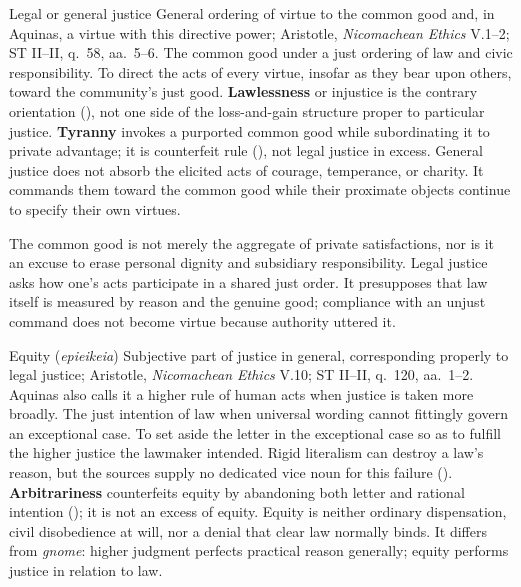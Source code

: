 
\virtuedossier
  {Legal or general justice}
  {General ordering of virtue to the common good and, in Aquinas, a virtue with this directive power; Aristotle, \emph{Nicomachean Ethics} V.1--2; ST II--II, q.~58, aa.~5--6.}
  {The common good under a just ordering of law and civic responsibility.}
  {To direct the acts of every virtue, insofar as they bear upon others, toward the community's just good.}
  {\textbf{Lawlessness} or injustice is the contrary orientation (), not one side of the loss-and-gain structure proper to particular justice.}
  {\textbf{Tyranny} invokes a purported common good while subordinating it to private advantage; it is counterfeit rule (), not legal justice in excess.}
  {General justice does not absorb the elicited acts of courage, temperance, or charity. It commands them toward the common good while their proximate objects continue to specify their own virtues.}

The common good is not merely the aggregate of private satisfactions, nor is it an excuse to erase personal dignity and subsidiary responsibility. Legal justice asks how one's acts participate in a shared just order. It presupposes that law itself is measured by reason and the genuine good; compliance with an unjust command does not become virtue because authority uttered it.


\virtuedossier
  {Equity (\emph{epieikeia})}
  {Subjective part of justice in general, corresponding properly to legal justice; Aristotle, \emph{Nicomachean Ethics} V.10; ST II--II, q.~120, aa.~1--2. Aquinas also calls it a higher rule of human acts when justice is taken more broadly.}
  {The just intention of law when universal wording cannot fittingly govern an exceptional case.}
  {To set aside the letter in the exceptional case so as to fulfill the higher justice the lawmaker intended.}
  {Rigid literalism can destroy a law's reason, but the sources supply no dedicated vice noun for this failure ().}
  {\textbf{Arbitrariness} counterfeits equity by abandoning both letter and rational intention (); it is not an excess of equity.}
  {Equity is neither ordinary dispensation, civil disobedience at will, nor a denial that clear law normally binds. It differs from \emph{gnome}: higher judgment perfects practical reason generally; equity performs justice in relation to law.}

